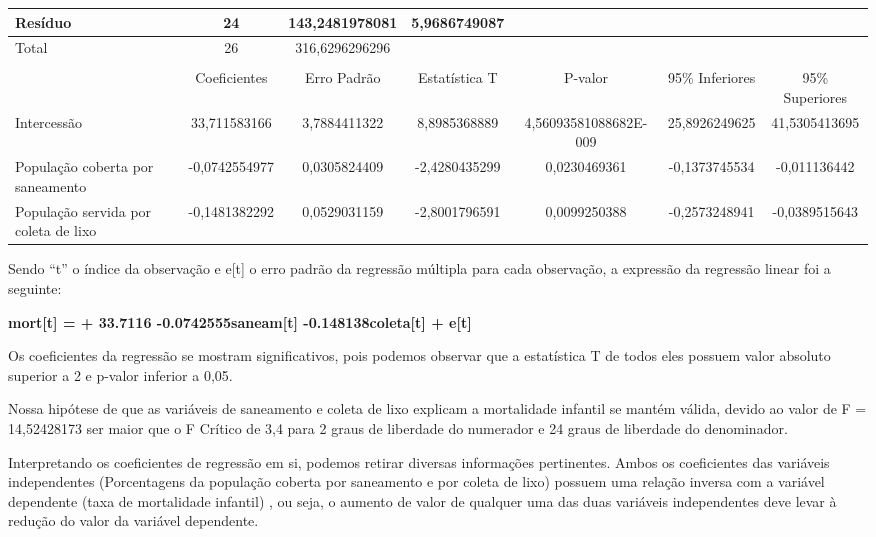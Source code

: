 \begin{table}[h]
{\begin{tabular}{|l|c|c|c|c|c|c|}
Resíduo                              & 24                    & 143,2481978081        & 5,9686749087          &                       &                       &                       \\ \hline
Total                                & 26                    & 316,6296296296        &                       &                       &                       &                       \\ \hline
                                     & \multicolumn{1}{l|}{} & \multicolumn{1}{l|}{} & \multicolumn{1}{l|}{} & \multicolumn{1}{l|}{} & \multicolumn{1}{l|}{} & \multicolumn{1}{l|}{} \\ \hline
                                     & Coeficientes          & Erro Padrão           & Estatística T         & P-valor               & 95\% Inferiores       & 95\% Superiores       \\ \hline
Intercessão                          & 33,711583166          & 3,7884411322          & 8,8985368889          & 4,56093581088682E-009 & 25,8926249625         & 41,5305413695         \\ \hline
População coberta por saneamento     & -0,0742554977         & 0,0305824409          & -2,4280435299         & 0,0230469361          & -0,1373745534         & -0,011136442          \\ \hline
População servida por coleta de lixo & -0,1481382292         & 0,0529031159          & -2,8001796591         & 0,0099250388          & -0,2573248941         & -0,0389515643         \\ \hline
\end{tabular}%
}
\end{table}

Sendo “t” o índice da observação e e[t] o erro padrão da regressão múltipla para cada observação, a expressão da regressão linear foi a seguinte:

\textbf{mort[t] = + 33.7116 -0.0742555saneam[t] -0.148138coleta[t] + e[t]}

Os coeficientes da regressão se mostram significativos, pois podemos observar que a estatística T de todos eles possuem valor absoluto superior a 2 e p-valor inferior a 0,05.

Nossa hipótese de que as variáveis de saneamento e coleta de lixo explicam a mortalidade infantil se mantém válida, devido ao valor de F = 14,52428173 ser maior que o F Crítico
de 3,4 para 2 graus de liberdade do numerador e 24 graus de liberdade do denominador.

Interpretando os coeficientes de regressão em si, podemos retirar diversas informações pertinentes. Ambos os coeficientes das variáveis independentes (Porcentagens da população
coberta por saneamento e por coleta de lixo) possuem uma relação inversa com a variável dependente (taxa de mortalidade infantil) , ou seja, o aumento de valor de qualquer uma das
duas variáveis independentes deve levar à redução do valor da variável dependente.


